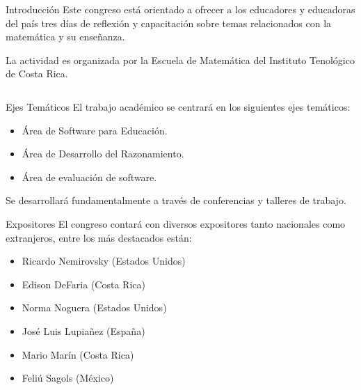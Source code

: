 \documentclass[svgnames,table, x11names, 11pt]{beamer}
\begin{document}
\begin{frame}[fragile]{}
\begin{columns}[t]
\begin{column}{0.33\textwidth}
\begin{block}{Introducción}
Este congreso está orientado a ofrecer a los educadores y educadoras del país tres días de reflexión y capacitación sobre temas relacionados con la matemática y su enseñanza.

La actividad es organizada por la Escuela de Matemática del Instituto Tenológico de Costa Rica.
				\end{block}
			\end{column}
		\end{columns}
		
	\end{frame}
	
	
	

	\begin{frame}[fragile]{} 
	
\begin{columns}[t]
\begin{column}{0.33\textwidth}
\begin{block}{Ejes Temáticos}
El trabajo académico se centrará en los siguientes ejes temáticos:

\begin{itemize}
\item Área de Software para Educación.

\item Área de Desarrollo del Razonamiento.

\item Área de evaluación de software.
\end{itemize}

Se desarrollará fundamentalmente a través de conferencias y talleres de trabajo.
				\end{block}
				
				\begin{block}{Expositores}
El congreso contará con diversos expositores tanto nacionales como extranjeros, entre los más destacados están:

\begin{itemize}
\item Ricardo Nemirovsky (Estados Unidos)

\item Edison DeFaria (Costa Rica)

\item Norma Noguera (Estados Unidos)

\item José Luis Lupiañez (España)

\item Mario Marín (Costa Rica)

\item Feliú Sagols (México)


\end{itemize}
\end{block}
\end{column}
\end{columns}
\end{frame}
\end{document}
